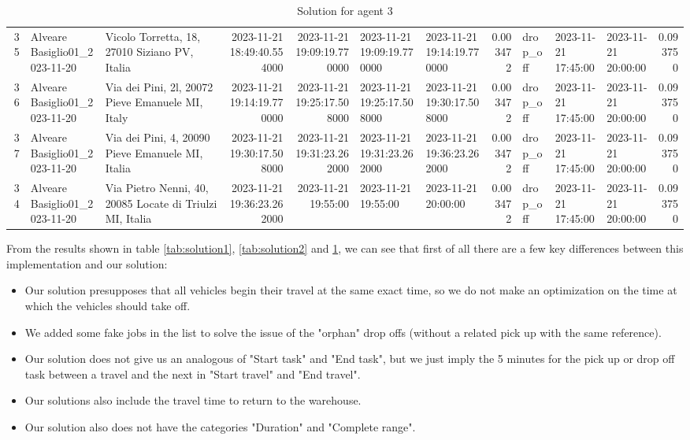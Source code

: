 \documentclass[titlepage]{article}
\begin{document}
\begin{table}[H]
\begin{adjustbox}{max width=\textwidth}
\begin{tabular}{rllrrllrlllr}
35 & Alveare Basiglio01\_2023-11-20 & Vicolo Torretta, 18, 27010 Siziano PV, Italia & 2023-11-21 18:49:40.554000 & 2023-11-21 19:09:19.770000 & 2023-11-21 19:09:19.770000 & 2023-11-21 19:14:19.770000 & 0.003472 & drop\_off & 2023-11-21 17:45:00 & 2023-11-21 20:00:00 & 0.093750 \\
36 & Alveare Basiglio01\_2023-11-20 & Via dei Pini, 2l, 20072 Pieve Emanuele MI, Italy & 2023-11-21 19:14:19.770000 & 2023-11-21 19:25:17.508000 & 2023-11-21 19:25:17.508000 & 2023-11-21 19:30:17.508000 & 0.003472 & drop\_off & 2023-11-21 17:45:00 & 2023-11-21 20:00:00 & 0.093750 \\
37 & Alveare Basiglio01\_2023-11-20 & Via dei Pini, 4, 20090 Pieve Emanuele MI, Italia & 2023-11-21 19:30:17.508000 & 2023-11-21 19:31:23.262000 & 2023-11-21 19:31:23.262000 & 2023-11-21 19:36:23.262000 & 0.003472 & drop\_off & 2023-11-21 17:45:00 & 2023-11-21 20:00:00 & 0.093750 \\
34 & Alveare Basiglio01\_2023-11-20 & Via Pietro Nenni, 40, 20085 Locate di Triulzi MI, Italia & 2023-11-21 19:36:23.262000 & 2023-11-21 19:55:00 & 2023-11-21 19:55:00 & 2023-11-21 20:00:00 & 0.003472 & drop\_off & 2023-11-21 17:45:00 & 2023-11-21 20:00:00 & 0.093750 \\
\bottomrule
\end{tabular}
\end{adjustbox}
\caption{Solution for agent 3}
\label{tab:solution3}
\end{table}

From the results shown in table \ref{tab:solution1}, \ref{tab:solution2} and \ref{tab:solution3}, we can see that first of all there are a few key differences between this implementation and our solution:
\begin{itemize}
    \item Our solution presupposes that all vehicles begin their travel at the same exact time, so we do not make an optimization on the time at which the vehicles should take off.
    \item We added some fake jobs in the list to solve the issue of the "orphan" drop offs (without a related pick up with the same reference).
    \item Our solution does not give us an analogous of "Start task" and "End task", but we just imply the 5 minutes for the pick up or drop off task between a travel and the next in "Start travel" and "End travel".
    \item Our solutions also include the travel time to return to the warehouse.
    \item Our solution also does not have the categories "Duration" and "Complete range".
\end{itemize}
\end{document}
